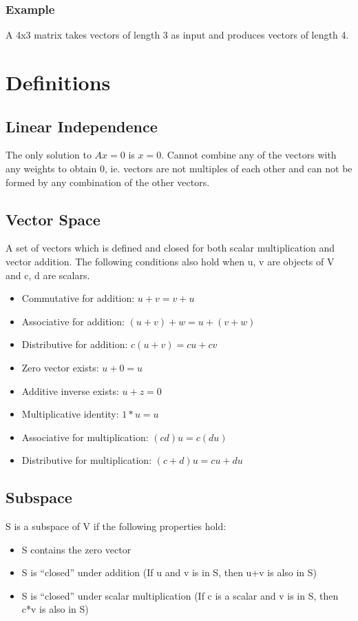 \documentclass[12pt]{article}
\begin{document}
\subsubsection{Example}
A 4x3 matrix takes vectors of length 3 as input and produces vectors of length 4.


\section{Definitions}
\subsection{Linear Independence}
The only solution to $Ax = 0$ is $x = 0$. Cannot combine any of the vectors with any weights to obtain 0, ie. vectors are not multiples of each other and can not be formed by any combination of the other vectors.

\subsection{Vector Space}
A set of vectors which is defined and closed for both scalar multiplication and vector addition. The following conditions also hold when u, v are objects of V and c, d are scalars.  
\begin{itemize}
\item Commutative for addition: $u+v = v+u$
\item Associative for addition: $(u + v) + w = u + (v + w)$
\item Distributive for addition: $c(u + v) = cu + cv$
\item Zero vector exists: $u + 0 = u$
\item Additive inverse exists: $u + z = 0$
\item Multiplicative identity: $1 * u = u$
\item Associative for multiplication: $(cd)u = c(du)$
\item Distributive for multiplication: $(c+d)u = cu + du$
\end {itemize}

\subsection{Subspace}
S is a subspace of V if the following properties hold:
\begin{itemize}
\item S contains the zero vector
\item S is “closed” under addition (If u and v is in S, then u+v is also in S)
\item S is “closed” under scalar multiplication (If c is a scalar and v is in S, then c*v is also in S)
\end{itemize}
\end{document}
